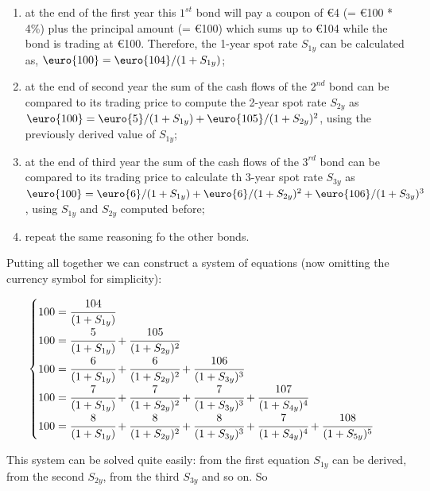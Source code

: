 \begin{enumerate}
\item at the end of the first year this $1^{st}$ bond will pay a coupon of \euro{4} (= \euro{100} * 4\%) plus the principal amount (= \euro{100}) which sums up to \euro{104} while the bond is trading at \euro{100}. Therefore, the 1-year spot rate $S_{1y}$ can be calculated as, $\mbox{\euro{100}} = \mbox{\euro{104}} / (1 + S_{1y})$;

\item at the end of second year the sum of the cash flows of the $2^{nd}$ bond can be compared to its trading price to compute the 2-year spot rate $S_{2y}$ as $\mbox{\euro{100}} = \mbox{\euro{5}} / (1 + S_{1y}) + \mbox{\euro{105}} / (1 + S_{2y})^{2}$, using the previously derived value of $S_{1y}$;

\item at the end of third year the sum of the cash flows of the $3^{rd}$ bond can be compared to its trading price to calculate th 3-year spot rate $S_{3y}$ as $\mbox{\euro{100}} = \mbox{\euro{6}} / (1 + S_{1y}) + \mbox{\euro{6}} / (1 + S_{2y})^{2} + \mbox{\euro{106}} / (1 + S_{3y})^{3}$, using $S_{1y}$ and $S_{2y}$ computed before;

\item repeat the same reasoning fo the other bonds.
\end{enumerate}

Putting all together we can construct a system of equations (now omitting the currency symbol for simplicity):

\begin{equation*}
\begin{cases}
100 = \cfrac{104}{(1 + S_{1y})} \\
100 = \cfrac{5}{(1 + S_{1y})} + \cfrac{105}{(1 + S_{2y})^{2}} \\
100 = \cfrac{6} {(1 + S_{1y})} + \cfrac{6}{(1 + S_{2y})^{2}} + \cfrac{106} {(1 + S_{3y})^{3}} \\
100 = \cfrac{7} {(1 + S_{1y})} + \cfrac{7} {(1 + S_{2y})^{2}} + \cfrac{7} {(1 + S_{3y})^{3}} + \cfrac{107} {(1 + S_{4y})^{4}} \\
100 = \cfrac{8} {(1 + S_{1y})} + \cfrac{8} {(1 + S_{2y})^{2}}+ \cfrac{8} {(1 + S_{3y})^{3}} + \cfrac{7} {(1 + S_{4y})^{4}} + \cfrac{108} {(1 + S_{5y})^{5}}
\end{cases}
\end{equation*}

This system can be solved quite easily: from the first equation $S_{1y}$ can be derived, from the second $S_{2y}$, from the third $S_{3y}$ and so on. So

